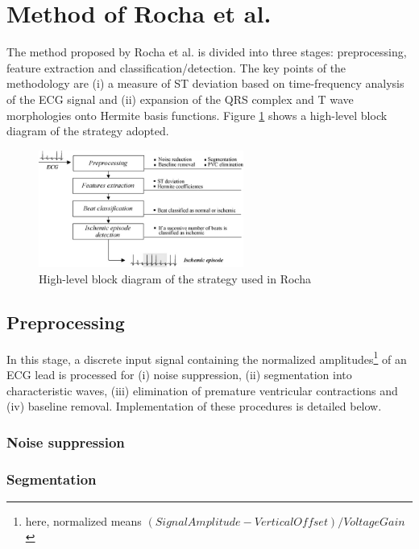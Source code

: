 
\section{Method of Rocha et al.}
\label{sec:section2}

The method proposed by Rocha et al. is divided into three stages: preprocessing, feature extraction and classification/detection. The key points of the methodology are (i) a measure of ST deviation based on time-frequency analysis of the ECG signal and (ii) expansion of the QRS complex and T wave morphologies onto Hermite basis functions. Figure \ref{fig:rocha_01} shows a high-level block diagram of the strategy adopted.

\begin{figure}[h]
    \centering
    \includegraphics[width=0.6\textwidth]{figures/rocha_01.png}
    \caption[Rocha strategy block diagram]
    {High-level block diagram of the strategy used in Rocha}
    \label{fig:rocha_01}
\end{figure}

\subsection{Preprocessing}
    In this stage, a discrete input signal containing the normalized amplitudes\footnote{here, normalized means $(SignalAmplitude - VerticalOffset) / VoltageGain$} of an ECG lead is processed for (i) noise suppression, (ii) segmentation into characteristic waves, (iii) elimination of premature ventricular contractions and (iv) baseline removal. Implementation of these procedures is detailed below.
    
    \subsubsection{Noise suppression}
    \subsubsection{Segmentation}
